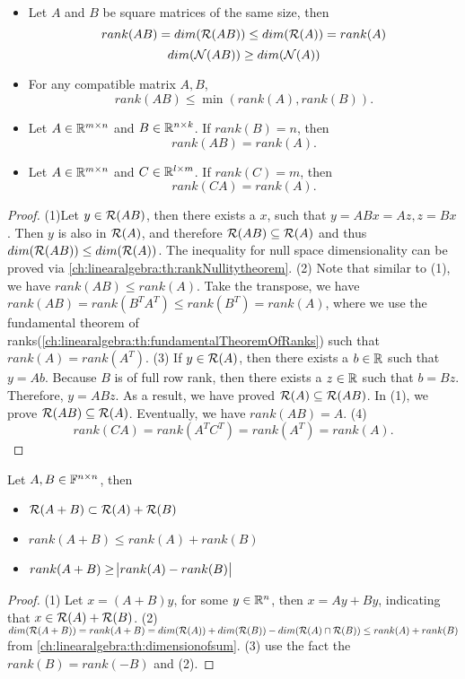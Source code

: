 \begin{refsection}
\begin{lemma}\label{ch:linearalgebra:th:rankOfMatrixProducts}\hfill
\begin{itemize}
	\item Let $A$ and $B$ be square matrices of the same size, then 
	$$rank(AB) = dim(\mathcal{R}(AB)) \leq dim(\mathcal{R}(A)) = rank(A)$$
	$$dim(\mathcal{N}(AB)) \geq dim(\mathcal{N}(A))$$
	\item For any compatible matrix $A,B$, $$rank(AB)\leq \min(rank(A),rank(B)).$$
	\item Let $A\in \mathbb{R}^{m\times n}$ and $B\in \mathbb{R}^{n\times k}$. If $rank(B) = n$, then
	$$rank(AB) = rank(A).$$
	\item Let $A\in \mathbb{R}^{m\times n}$ and $C\in \mathbb{R}^{l\times m}$. If $rank(C) = m$, then
	$$rank(CA) = rank(A).$$
\end{itemize}	
\end{lemma}
\begin{proof}
	(1)Let $y\in \mathcal{R}(AB)$, then there exists a $x$, such that $y = ABx = Az,z=Bx$. Then $y$ is also in $\mathcal{R}(A)$, and therefore $\mathcal{R}(AB)\subseteq \mathcal{R}(A)$ and thus
	$dim(\mathcal{R}(AB)) \leq dim(\mathcal{R}(A))$. The inequality for null space dimensionality can be proved via \autoref{ch:linearalgebra:th:rankNullitytheorem}.
	(2) Note that similar to (1), we have $rank(AB) \leq rank(A)$. Take the transpose, we have
	$rank(AB) = rank(B^TA^T)\leq rank(B^T) = rank(A)$, where we use the fundamental theorem of ranks(\autoref{ch:linearalgebra:th:fundamentalTheoremOfRanks}) such that $rank(A) = rank(A^T)$.
	(3) If $y\in \mathcal{R}(A)$, then there exists a $b\in \mathbb{R}$ such that $y = Ab$. Because $B$ is of full row rank, then there exists a $z \in \mathbb{R}$ such that $b = Bz$. Therefore, $y = ABz$. As a result, we have proved $\mathcal{R}(A) \subseteq \mathcal{R}(AB)$. In (1), we prove $\mathcal{R}(AB)\subseteq \mathcal{R}(A)$. Eventually, we have $rank(AB) = A$.
	(4)
	$$rank(CA) = rank(A^TC^T) = rank(A^T) = rank(A).$$
\end{proof}


\begin{theorem}\cite[206]{meyer2000matrix}\label{ch:linearalgebra:th:ranksuminequality}
	Let $A, B \in \mathbb{F}^{n\times n}$, then 
	\begin{itemize}
		\item $\mathcal{R}(A + B) \subset \mathcal{R}(A) + \mathcal{R}(B)$
		\item $rank(A + B) \leq rank(A) + rank(B)$
		\item $rank(A + B) \geq \abs{rank(A) - rank(B)}$
	\end{itemize}
\end{theorem}
\begin{proof}
	(1)	Let $x = (A + B)y$, for some $y\in \mathbb{R}^n$, then $x = Ay + By$, indicating that $x\in \mathcal{R}(A) + \mathcal{R}(B)$.
	(2) $dim(\mathcal{R}(A+B)) = rank(A+B) = dim(\mathcal{R}(A)) + dim(\mathcal{R}(B)) - dim(\mathcal{R}(A)\cap \mathcal{R}(B)) \leq rank(A) + rank(B)$ from \autoref{ch:linearalgebra:th:dimensionofsum}.
	(3)	use the fact the $rank(B) = rank(-B)$ and (2).
\end{proof}


\end{refsection}
